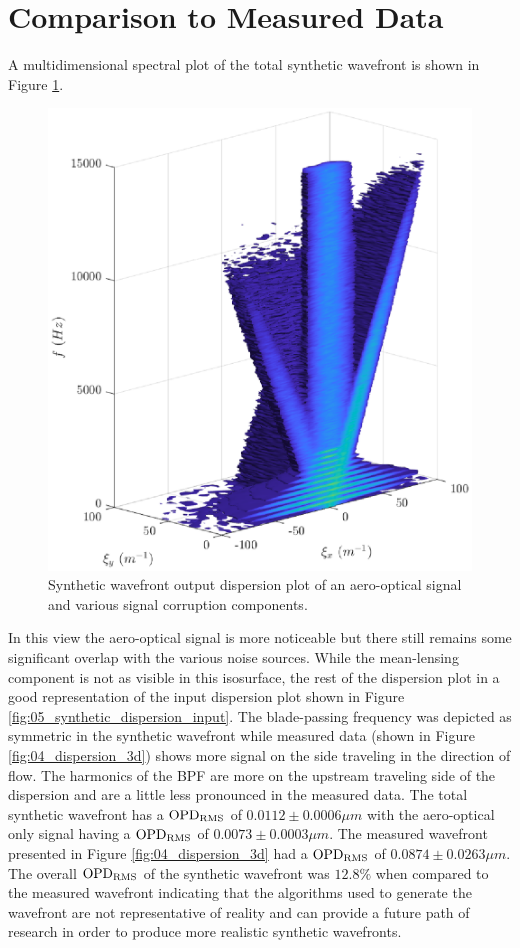 \section{Comparison to Measured Data}
A multidimensional spectral plot of the total synthetic wavefront is shown in Figure \ref{fig:dispersion_comp_synthetic}.
\begin{figure}
 \centering
 \includegraphics{../matlab/05_synthetic_wavefront/dispersion_comp_synthetic.eps}
 \caption{Synthetic wavefront output dispersion plot of an aero-optical signal and various signal corruption components.}
 \label{fig:dispersion_comp_synthetic}
\end{figure}
In this view the aero-optical signal is more noticeable but there still remains some significant overlap with the various noise sources.
While the mean-lensing component is not as visible in this isosurface, the rest of the dispersion plot in a good representation of the input dispersion plot shown in Figure \ref{fig:05_synthetic_dispersion_input}.
The blade-passing frequency was depicted as symmetric in the synthetic wavefront while measured data (shown in Figure \ref{fig:04_dispersion_3d}) shows more signal on the side traveling in the direction of flow.
The harmonics of the BPF are more on the upstream traveling side of the dispersion and are a little less pronounced in the measured data.
The total synthetic wavefront has a $\operatorname{OPD_{RMS}}$ of $0.0112\pm0.0006\mu m$ with the aero-optical only signal having a $\operatorname{OPD_{RMS}}$ of $0.0073\pm0.0003\mu m$.
The measured wavefront presented in Figure \ref{fig:04_dispersion_3d} had a $\operatorname{OPD_{RMS}}$ of $0.0874\pm0.0263\mu m$.
The overall $\operatorname{OPD_{RMS}}$ of the synthetic wavefront was $12.8\%$ when compared to the measured wavefront indicating that the algorithms used to generate the wavefront are not representative of reality and can provide a future path of research in order to produce more realistic synthetic wavefronts.

